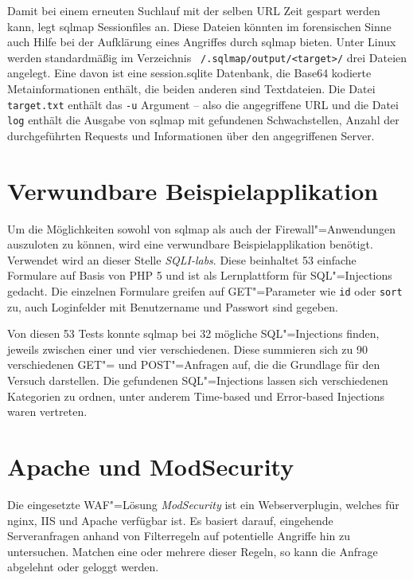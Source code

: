 Damit bei einem erneuten Suchlauf mit der selben URL Zeit gespart werden kann, legt sqlmap Sessionfiles an. Diese Dateien könnten im forensischen Sinne auch Hilfe bei der Aufklärung eines Angriffes durch sqlmap bieten. Unter Linux werden standardmäßig im Verzeichnis \texttt{~/.sqlmap/output/<target>/} drei Dateien angelegt. Eine davon ist eine session.sqlite Datenbank, die Base64 kodierte Metainformationen enthält, die beiden anderen sind Textdateien. Die Datei \texttt{target.txt} enthält das \texttt{-u} Argument -- also die angegriffene URL und die Datei \texttt{log} enthält die Ausgabe von sqlmap mit gefundenen Schwachstellen, Anzahl der durchgeführten Requests und Informationen über den angegriffenen Server.

\section{Verwundbare Beispielapplikation}

Um die Möglichkeiten sowohl von sqlmap als auch der Firewall"=Anwendungen auszuloten zu können, wird eine verwundbare Beispielapplikation benötigt. Verwendet wird an dieser Stelle \emph{SQLI-labs}. Diese beinhaltet 53 einfache Formulare auf Basis von PHP 5 und ist als Lernplattform für SQL"=Injections gedacht. Die einzelnen Formulare greifen auf GET"=Parameter wie \texttt{id} oder \texttt{sort} zu, auch Loginfelder mit Benutzername und Passwort sind gegeben.

Von diesen 53 Tests konnte sqlmap bei 32 mögliche SQL"=Injections finden, jeweils zwischen einer und vier verschiedenen. Diese summieren sich zu 90 verschiedenen GET"= und POST"=Anfragen auf, die die Grundlage für den Versuch darstellen. Die gefundenen SQL"=Injections lassen sich verschiedenen Kategorien zu ordnen, unter anderem Time-based und Error-based Injections waren vertreten.

\section{Apache und ModSecurity}
\label{sec:modsecurity}

Die eingesetzte WAF"=Lösung \emph{ModSecurity} ist ein Webserverplugin, welches für nginx, IIS und Apache verfügbar ist. Es basiert darauf, eingehende Serveranfragen anhand von Filterregeln auf potentielle Angriffe hin zu untersuchen. Matchen eine oder mehrere dieser Regeln, so kann die Anfrage abgelehnt oder geloggt werden.

